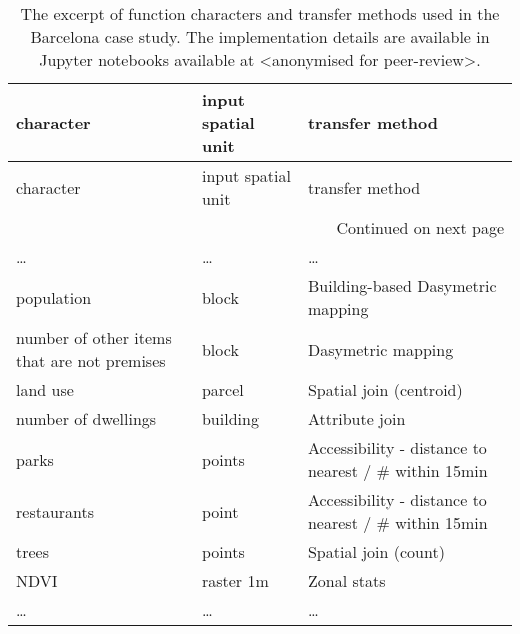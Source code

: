 \begin{longtable}{p{5cm}p{3cm}p{5cm}}
\caption{The excerpt of function characters and transfer methods used in the Barcelona case study. The implementation details are available
in Jupyter notebooks available at <anonymised for peer-review>.}
\label{tab:bcn_fn_excerpt} \\
\toprule
                                        character & input spatial unit &                                    transfer method \\
\midrule
\endfirsthead

\toprule
                                        character & input spatial unit &                                    transfer method \\
\midrule
\endhead
\midrule
\multicolumn{3}{r}{{Continued on next page}} \\
\midrule
\endfoot

\bottomrule
\endlastfoot
\dots &                        \dots &                   \dots  \\

                                        population &              block &                  Building-based Dasymetric mapping \\
    number of other items that are not premises &              block &                                 Dasymetric mapping \\
                                        land use &             parcel &                            Spatial join (centroid) \\
                            number of dwellings &           building &                                     Attribute join \\
                                            parks &             points & Accessibility  - distance to nearest / \# within 15min \\
                                    restaurants &              point & Accessibility  - distance to nearest / \# within 15min \\
                                            trees &             points &                               Spatial join (count) \\
                                            NDVI &          raster 1m &                                        Zonal stats \\
                                            \dots &                        \dots &                   \dots  \\

\end{longtable}
\normalsize


